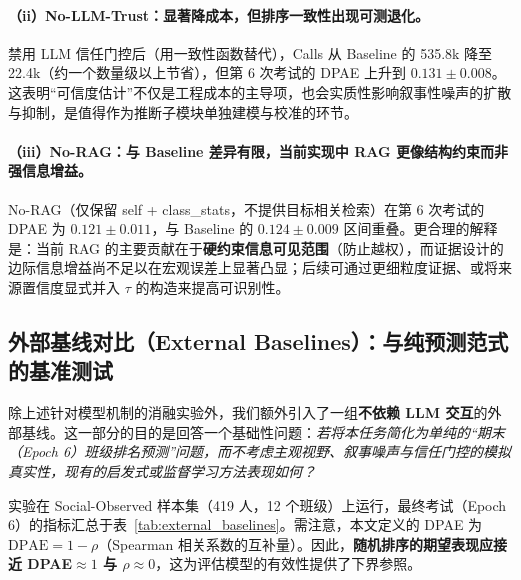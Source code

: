 \documentclass[UTF8, a4paper, 11pt]{ctexart}
\begin{document}
\paragraph{（ii）No-LLM-Trust：显著降成本，但排序一致性出现可测退化。}
禁用 LLM 信任门控后（用一致性函数替代），Calls 从 Baseline 的 535.8k 降至 22.4k（约一个数量级以上节省），但第 6 次考试的 DPAE 上升到 \(0.131\pm0.008\)。这表明“可信度估计”不仅是工程成本的主导项，也会实质性影响叙事性噪声的扩散与抑制，是值得作为推断子模块单独建模与校准的环节。
\paragraph{（iii）No-RAG：与 Baseline 差异有限，当前实现中 RAG 更像结构约束而非强信息增益。}
No-RAG（仅保留 self + class\_stats，不提供目标相关检索）在第 6 次考试的 DPAE 为 \(0.121\pm0.011\)，与 Baseline 的 \(0.124\pm0.009\) 区间重叠。更合理的解释是：当前 RAG 的主要贡献在于\textbf{硬约束信息可见范围}（防止越权），而证据设计的边际信息增益尚不足以在宏观误差上显著凸显；后续可通过更细粒度证据、或将来源置信度显式并入 \(\tau\) 的构造来提高可识别性。

\subsection{外部基线对比（External Baselines）：与纯预测范式的基准测试}
\label{subsec:external_baselines}

除上述针对模型机制的消融实验外，我们额外引入了一组\textbf{不依赖 LLM 交互}的外部基线。这一部分的目的是回答一个基础性问题：\emph{若将本任务简化为单纯的“期末（Epoch 6）班级排名预测”问题，而不考虑主观视野、叙事噪声与信任门控的模拟真实性，现有的启发式或监督学习方法表现如何？}

实验在 Social-Observed 样本集（419 人，12 个班级）上运行，最终考试（Epoch 6）的指标汇总于表~\ref{tab:external_baselines}。需注意，本文定义的 DPAE 为 \(\text{DPAE}=1-\rho\)（Spearman 相关系数的互补量）。因此，\textbf{随机排序的期望表现应接近 DPAE\(\approx 1\) 与 \(\rho\approx 0\)}，这为评估模型的有效性提供了下界参照。
\end{document}
